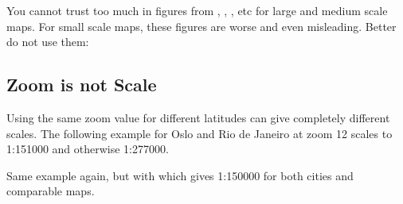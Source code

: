   You cannot trust too much in figures from
  ,
  ,
  , etc
  for large and medium scale maps.
  For small scale maps, these figures are worse and even misleading.
  Better do not use them:

  \begin{dispExample}
  \end{dispExample}


\clearpage
\subsection{Zoom is not Scale}

  Using the same zoom value for different latitudes can give completely
  different scales. The following example for Oslo and Rio de Janeiro
  at zoom 12 scales to 1:151000 and otherwise 1:277000.
  \tikzexternaldisable

  \begin{dispExample}
    \hfill{}
    \begin{center}\fontsize{7pt}{7pt}\sffamily\mrcmapattribution\end{center}
  \end{dispExample}

  Same example again, but with  which gives
  1:150000 for both cities and comparable maps.

